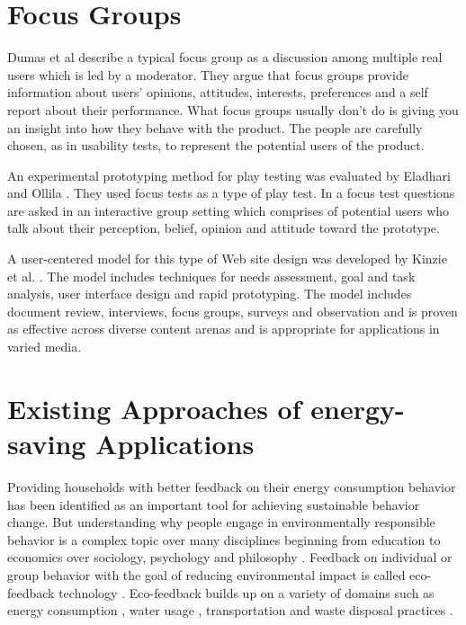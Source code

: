 \section{Focus Groups}

Dumas et al \cite{dumas1999practical} describe a typical focus group as a discussion among multiple real users which is led by a moderator. They argue that focus groups provide information about users' opinions, attitudes, interests, preferences and a self report about their performance. What focus groups usually don't do is giving you an insight into how they behave with the product. The people are carefully chosen, as in usability tests, to represent the potential users of the product.

An experimental prototyping method for play testing was evaluated by Eladhari and Ollila \cite{eladhari2012design}. They used focus tests as a type of play test. In a focus test questions are asked in an interactive group setting which comprises of potential users who talk about their perception, belief, opinion and attitude toward the prototype.

A user-centered model for this type of Web site design was developed by Kinzie et al. \cite{kinzie2002user}. The model includes techniques for needs assessment, goal and task analysis, user interface design and rapid prototyping. The model includes document
review, interviews, focus groups, surveys and observation and is proven as effective across diverse content arenas and is appropriate for applications in varied media.

\section{Existing Approaches of energy-saving Applications}

Providing households with better feedback on their energy consumption behavior has been identified as an important tool for achieving sustainable behavior change. But understanding why people engage in environmentally responsible behavior is a complex topic over many disciplines beginning from education to economics over sociology, psychology and philosophy \cite{froehlich2010design}. Feedback on individual or group behavior with the goal of reducing environmental impact is called eco-feedback technology \cite{mccalley1998computer, holstius2004infotropism, froehlich2010design}. Eco-feedback builds up on a variety of domains such as energy consumption \cite{holmes2007eco}, water usage \cite{arroyo2005waterbot}, transportation \cite{froehlich2009ubigreen, tulusan2012providing} and waste disposal practices \cite{holstius2004infotropism}.


